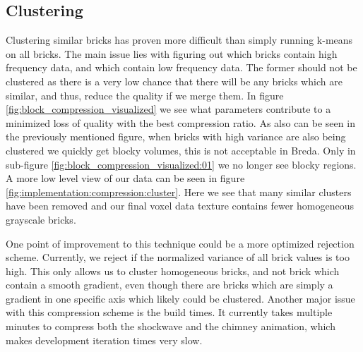 \subsection{Clustering} \label{results:clustering}
Clustering similar bricks has proven more difficult than simply running k-means on all bricks. The main issue lies with figuring out which bricks contain high frequency data, and which contain low frequency data. The former should not be clustered as there is a very low chance that there will be any bricks which are similar, and thus, reduce the quality if we merge them. In figure \ref{fig:block_compression_visualized} we see what parameters contribute to a minimized loss of quality with the best compression ratio. As also can be seen in the previously mentioned figure, when bricks with high variance are also being clustered we quickly get blocky volumes, this is not acceptable in Breda. Only in sub-figure \ref{fig:block_compression_visualized:01} we no longer see blocky regions. A more low level view of our data can be seen in figure \ref{fig:implementation:compression:cluster}. Here we see that many similar clusters have been removed and our final voxel data texture contains fewer homogeneous grayscale bricks. 


One point of improvement to this technique could be a more optimized rejection scheme. Currently, we reject if the normalized variance of all brick values is too high. This only allows us to cluster homogeneous bricks, and not brick which contain a smooth gradient, even though there are bricks which are simply a gradient in one specific axis which likely could be clustered. Another major issue with this compression scheme is the build times. It currently takes multiple minutes to compress both the shockwave and the chimney animation, which makes development iteration times very slow.



